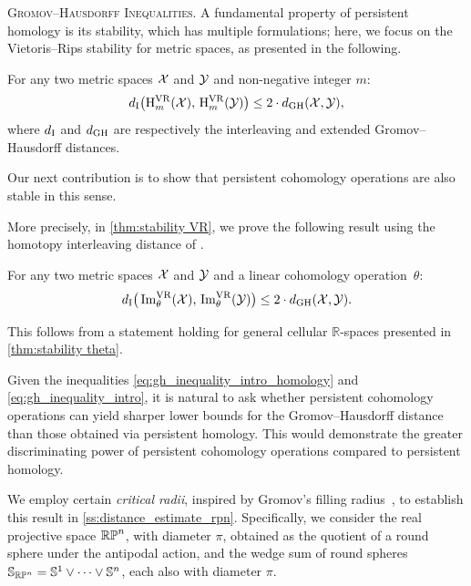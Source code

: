 \medskip\noindent\textsc{Gromov--Hausdorff Inequalities.}
A fundamental property of persistent homology is its stability, which has multiple formulations; here, we focus on the Vietoris--Rips stability for metric spaces, as presented in the following.
\begin{theorem*}
	\label{thm:stability ph}
	For any two metric spaces $\mathcal{X}$ and $\mathcal{Y}$ and non-negative integer $m$:
	\begin{equation}\label{eq:gh_inequality_intro_homology}
		d_{\mathrm{I}}\big(\mathrm{H}_m^{\mathrm{VR}}(\mathcal{X}),\, \mathrm{H}_m^{\mathrm{VR}}(\mathcal{Y})\big) \leq 2 \cdot d_{\mathrm{GH}}(\mathcal{X},\mathcal{Y}),
	\end{equation}
	where \(d_{\mathrm{I}}\) and \(d_{\mathrm{GH}}\) are respectively the interleaving and extended Gromov--Hausdorff distances.
\end{theorem*}

Our next contribution is to show that persistent cohomology operations are also stable in this sense.

More precisely, in \cref{thm:stability VR}, we prove the following result using the homotopy interleaving distance of \cite{blumberg2023interleaving}.

\begin{introtheorem}\label{thm:stability intro}
	For any two metric spaces $\mathcal{X}$ and $\mathcal{Y}$ and a linear cohomology operation~$\theta$:
	\begin{equation}\label{eq:gh_inequality_intro}
		d_{\mathrm{I}}\big(\operatorname{Im}_\theta^{\mathrm{VR}}(\mathcal{X}),\, \operatorname{Im}_\theta^{\mathrm{VR}}(\mathcal{Y})\big) \leq 2 \cdot d_{\mathrm{GH}}(\mathcal{X},\mathcal{Y}).
	\end{equation}
\end{introtheorem}

This follows from a statement holding for general cellular $\mathbb{R}$-spaces presented in \cref{thm:stability theta}.

\medskip Given the inequalities \eqref{eq:gh_inequality_intro_homology} and \eqref{eq:gh_inequality_intro},
it is natural to ask whether persistent cohomology operations can yield sharper lower bounds for the Gromov--Hausdorff distance than those obtained via persistent homology.
This would demonstrate the greater discriminating power of persistent cohomology operations compared to persistent homology.

We employ certain \textit{critical radii}, inspired by Gromov's filling radius~\cite{gromov1983filling}, to establish this result in \cref{ss:distance_estimate_rpn}.
Specifically, we consider the real projective space \(\mathbb{RP}^n\), with diameter \(\pi\), obtained as the quotient of a round sphere under the antipodal action, and the wedge sum of round spheres \(\mathbb{S}_{\mathbb{RP}^n} = \mathbb{S}^1 \vee \dots \vee \mathbb{S}^n\), each also with diameter \(\pi\).

